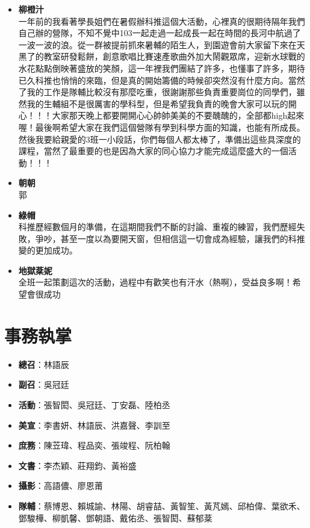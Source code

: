 \begin{itemize}
\item \textbf{柳橙汁} \\
一年前的我看著學長姐們在暑假辦科推這個大活動，心裡真的很期待隔年我們自己辦的營隊，不知不覺中103一起走過一起成長一起在時間的長河中航過了一波一波的浪。從一群被提前抓來暑輔的陌生人，到園遊會前大家留下來在天黑了的教室研發鬆餅，創意歌唱比賽速產歌曲外加大鬧觀眾席，迎新水球戰的水花點點倒映著盛放的笑顏，這一年裡我們團結了許多，也懂事了許多，期待已久科推也悄悄的來臨，但是真的開始籌備的時候卻突然沒有什麼方向。當然了我的工作是隊輔比較沒有那麼吃重，很謝謝那些負責重要崗位的同學們，雖然我的生輔組不是很厲害的學科型，但是希望我負責的晚會大家可以玩的開心！！！大家那天晚上都要開開心心帥帥美美的不要醜醜的，全部都high起來喔！最後啊希望大家在我們這個營隊有學到科學方面的知識，也能有所成長。然後我要給親愛的3班一小段話，你們每個人都太棒了，準備出這些具深度的課程，當然了最重要的也是因為大家的同心協力才能完成這麼盛大的一個活動！！！

\item \textbf{朝朝} \\
郭
\item \textbf{綠帽} \\
科推歷經數個月的準備，在這期間我們不斷的討論、重複的練習，我們歷經失敗，爭吵，甚至一度以為要開天窗，但相信這一切會成為經驗，讓我們的科推變的更加成功。

\item \textbf{地獄棻妮} \\
全班一起策劃這次的活動，過程中有歡笑也有汗水（熱啊），受益良多啊！希望會很成功~
\end{itemize}

\section{事務執掌}
\begin{itemize}
\item \textbf{總召}：林語辰
\item \textbf{副召}：吳冠廷
\item \textbf{活動}：張智閎、吳冠廷、丁安磊、陸柏丞
\item \textbf{美宣}：李書妍、林語辰、洪嘉聲、李訓至
\item \textbf{庶務}：陳苙瑋、程品奕、張竣程、阮柏翰
\item \textbf{文書}：李杰穎、莊翔鈞、黃裕盛
\item \textbf{攝影}：高語儂、廖恩莆
\item \textbf{隊輔}：蔡博恩、賴城諭、林陽、胡睿喆、黃智笙、黃芃嫣、邱柏偉、葉欲禾、鄧駿樺、柳凱馨、鄧朝語、戴佑丞、張智閎、蘇郁棻
\end{itemize}

